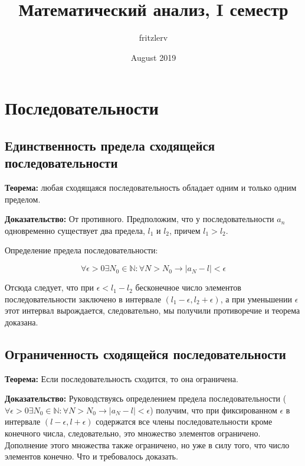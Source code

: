 \documentclass{article}
\title{Математический анализ, I семестр}
\author{fritzlerv}
\date{August 2019}
\begin{document}
\maketitle

\newpage

\tableofcontents

\newpage

\section{Последовательности}

\noindent{}

\subsection{Единственность предела сходящейся последовательности}

\textbf{Теорема:} любая сходящаяся последовательность обладает одним и только одним пределом.

\textbf{Доказательство:} От противного. Предположим, что у последовательности $a_n$ одновременно существует два предела, $l_1$ и $l_2$, причем $l_1 > l_2$. 

Определение предела последовательности: 

\[\forall \epsilon > 0 \exists N_0 \in \mathbb{N}: \forall N > N_0 \rightarrow |a_N - l| < \epsilon\]

Отсюда следует, что при $\epsilon < l_1 - l_2$ бесконечное число элементов последовательности заключено в интервале $\left ( l_1 - \epsilon, l_2 + \epsilon \right )$, а при уменьшении $\epsilon$ этот интервал вырождается, следовательно, мы получили противоречие и теорема доказана.

\subsection{Ограниченность сходящейся последовательности}

\textbf{Теорема:} Если последовательность сходится, то она ограничена.

\textbf{Доказательство:} Руководствуясь определением предела последовательности ($\forall \epsilon > 0 \exists N_0 \in \mathbb{N}: \forall N > N_0 \rightarrow |a_N - l| < \epsilon$) получим, что при фиксированном $\epsilon$ в интервале $\left ( l - \epsilon, l + \epsilon  \right )$ содержатся все члены последовательности кроме конечного числа, следовательно, это множество элементов ограничено. Дополнение этого множества также ограничено, но уже в силу того, что число элементов конечно. Что и требовалось доказать.
\end{document}
